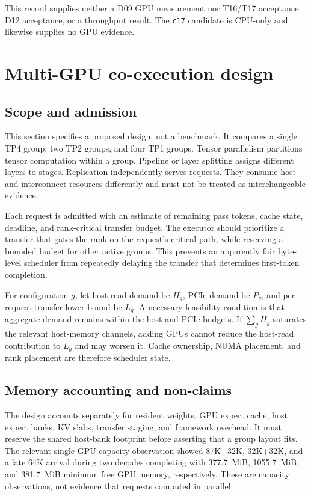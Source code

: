 \documentclass[11pt]{article}
\begin{document}
This record supplies neither a D09 GPU measurement nor T16/T17 acceptance, D12 acceptance, or a throughput result. The \texttt{c17} candidate is CPU-only and likewise supplies no GPU evidence.

\section{Multi-GPU co-execution design}

\subsection{Scope and admission}

This section specifies a proposed design, not a benchmark. It compares a single TP4 group, two TP2 groups, and four TP1 groups. Tensor parallelism partitions tensor computation within a group. Pipeline or layer splitting assigns different layers to stages. Replication independently serves requests. They consume host and interconnect resources differently and must not be treated as interchangeable evidence.

Each request is admitted with an estimate of remaining pass tokens, cache state, deadline, and rank-critical transfer budget. The executor should prioritize a transfer that gates the rank on the request's critical path, while reserving a bounded budget for other active groups. This prevents an apparently fair byte-level scheduler from repeatedly delaying the transfer that determines first-token completion.

For configuration $g$, let host-read demand be $H_g$, PCIe demand be $P_g$, and per-request transfer lower bound be $L_g$. A necessary feasibility condition is that aggregate demand remains within the host and PCIe budgets. If $\sum_g H_g$ saturates the relevant host-memory channels, adding GPUs cannot reduce the host-read contribution to $L_g$ and may worsen it. Cache ownership, NUMA placement, and rank placement are therefore scheduler state.

\subsection{Memory accounting and non-claims}

The design accounts separately for resident weights, GPU expert cache, host expert banks, KV slabs, transfer staging, and framework overhead. It must reserve the shared host-bank footprint before asserting that a group layout fits. The relevant single-GPU capacity observation showed 87K+32K, 32K+32K, and a late 64K arrival during two decodes completing with 377.7~MiB, 1055.7~MiB, and 381.7~MiB minimum free GPU memory, respectively. These are capacity observations, not evidence that requests computed in parallel.
\end{document}
